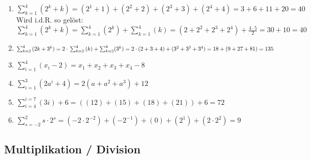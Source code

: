{{
\\
\\
\\
\\
}{%

\begin{enumerate}[label=\alph*)]
 \item $\sum_{k=1}^{4}{(2^k+k)} = (2^1+1) + (2^2+2) + (2^3+3) +
   (2^4+4) = 3 + 6 + 11 + 20 = 40$\\
   Wird i.d.R. so gelöst:\\
   $\sum_{k=1}^{4}{(2^k+k)} =
   \sum_{k=1}^{4}{(2^k)}+\sum_{k=1}^{4}{(k)} = (2+2^2+2^3+2^4) +
   \frac{4\cdot{}5}{2} = 30+10 = 40$

 \item $\sum_{k=2}^{4}{(2k+3^k)} = 2\cdot{}\sum_{k=2}^4{}(k) +
   \sum_{k=2}^4(3^k) = \\
   2\cdot{}(2+3+4) + (3^2+3^3+3^4) = 18 + (9+27+81) = 135$

 \item $\sum_{i=1}^{4}{(x_i-2)} = x_1+x_2+x_3+x_4 -8$
 \item $\sum_{i=1}^{3}{(2a^i+4)}  = 2(a + a^2 + a^3) + 12$
 \item $\sum_{i=4}^{i=7}(3i) + 6 = ((12) + (15) + (18) +(21) )+6=72$

 \item $\sum_{s=-2}^{2}s\cdot{}2^s = (-2\cdot{}2^{-2}) + (-2^{-1}) + (0) + (2^1) + (2\cdot{}2^2)=9$

\end{enumerate}
}%





\subsection{Multiplikation / Division}







}
